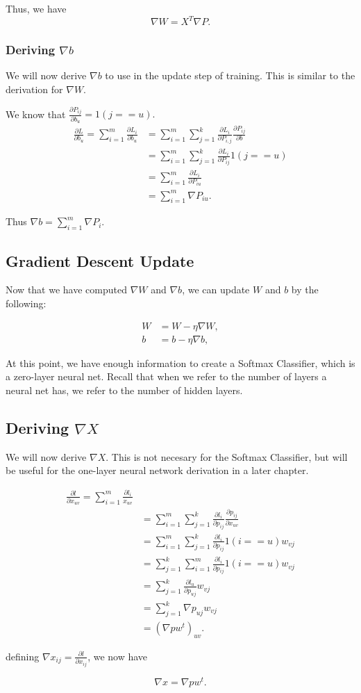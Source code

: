 Thus, we have
$$ \nabla W = X^T \nabla P. $$

\subsubsection{Deriving $\nabla b$}
We will now derive $\nabla b$ to use in the update step of training. This is
similar to the derivation for $\nabla W$.

We know that $\frac{\partial P_{ij}}{\partial b_u} = 1(j == u).$
\begin{align*} 
  \frac{\partial L}{\partial b_u} = 
  \sum_{i=1}^m \frac{\partial L_i}{\partial b_u} &= 
  \sum_{i=1}^m \sum_{j=1}^k \frac{\partial L_i}{\partial P_{i, j}}
  \frac{\partial P_{ij}}{\partial b}\\
  &= \sum_{i=1}^m \sum_{j=1}^k \frac{\partial L_i}{\partial P_{ij}} 1(j == u)\\
  &= \sum_{i=1}^m \frac{\partial L_i}{\partial P_{iu}} \\
  &= \sum_{i=1}^m \nabla P_{iu}.
\end{align*}

Thus $\nabla b = \sum_{i=1}^m \nabla P_i$.

\subsection{Gradient Descent Update}
Now that we have computed $\nabla W$ and $\nabla b$, we can update $W$
and $b$ by the following:

\begin{align*}
W &= W - \eta \nabla W,\\
b &= b - \eta \nabla b, 
\end{align*}

At this point, we have enough information to create a Softmax Classifier, which
is a zero-layer neural net. Recall that when we refer to the
number of layers a neural net has, we refer to the number of hidden layers.


\subsection{Deriving $\nabla X$}
We will now derive $\nabla X$. This is not necesary for the Softmax Classifier,
but will be useful for the one-layer neural network derivation in a later
chapter.

\begin{align*}
  \frac{\partial l}{\partial x_{uv}}
  =\sum_{i=1}^m \frac{\partial l_i}{x_{uv}}\\
  &= \sum_{i=1}^m \sum_{j=1}^k \frac{\partial l_i}{\partial p_{ij}}
      \frac{\partial p_{ij}}{\partial x_{uv}}\\
  &= \sum_{i=1}^m \sum_{j=1}^k \frac{\partial l_i}{\partial p_{ij}}
      1(i == u) w_{vj}\\
  &= \sum_{j=1}^k \sum_{i=1}^m \frac{\partial l_i}{\partial p_{ij}}
      1(i == u) w_{vj}\\
  &= \sum_{j=1}^k \frac{\partial l_u}{\partial p_{uj}} w_{vj}\\
  &= \sum_{j=1}^k \nabla p_{uj} w_{vj}\\
  &= \left( \nabla p w^t \right) _{uv}.
\end{align*}

defining $\nabla x_{ij} = \frac{\partial l}{\partial x_{ij}}$, we now have

$$ \nabla x = \nabla p w^t. $$
